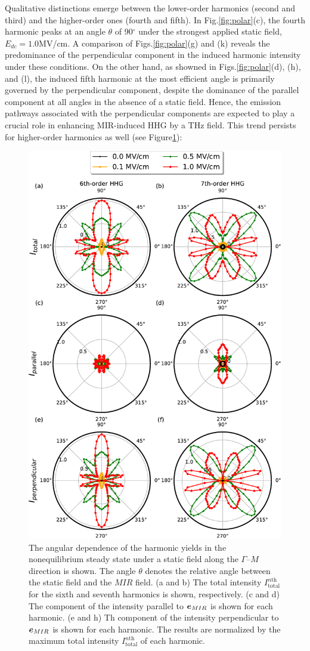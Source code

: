 Qualitative distinctions emerge between the lower-order harmonics (second and third) and the
higher-order ones (fourth and fifth). In Fig.\ref{fig:polar}(c), the fourth harmonic  peaks at
an angle $\theta$ of 90$^{\circ}$ under the strongest applied static field, $E_{dc}=1.0$MV/cm. A
comparison of Figs.\ref{fig:polar}(g) and (k) reveals the predominance of the perpendicular
component in the induced harmonic intensity under these conditions. On the other hand, as showned in
Figs.\ref{fig:polar}(d), (h), and (l), the induced fifth harmonic at the most efficient angle is
primarily governed by the perpendicular component, despite the dominance of the parallel component
at all angles in the absence of a static field. Hence, the emission pathways associated with the
perpendicular components are expected to play a crucial role in enhancing MIR-induced HHG by a
THz field. This trend persists for higher-order harmonics as well (see Figure\ref{fig:SI_polar}):
\begin{figure}[hbp]
	\center
	\includegraphics[width=0.8\linewidth]{pic/SI_polar.pdf}
	\caption{\label{fig:SI_polar}
		The angular dependence of the harmonic yields in the nonequilibrium steady state under a static field along the $\Gamma$--$M$ direction is shown. The angle $\theta$ denotes the relative angle between the static field and the $MIR$ field. (a and b) The total intensity $I^{n \textrm{th}}_{\mathrm{total}}$ for the sixth and seventh harmonics is shown, respectively. (c and d) The component of the intensity parallel to $\boldsymbol e_{MIR}$ is shown for each harmonic. (e and h) Th component of the intensity perpendicular to $\boldsymbol e_{MIR}$ is shown for each harmonic. The results are normalized by the maximum total intensity $I^{n \textrm{th}}_{\mathrm{total}}$ of each harmonic.
	}
\end{figure}
